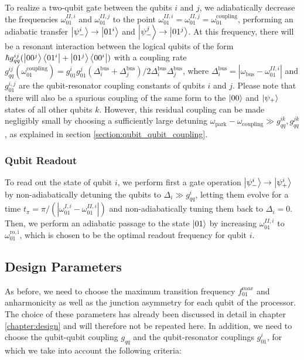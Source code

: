 To realize a two-qubit gate between the qubits $i$ and $j$, we adiabatically decrease the frequencies $\omega_{01}^{II,i}$ and $\omega_{01}^{II,j}$ to the point $\omega_{01}^{II,i}=\omega_{01}^{II,j}=\omega_{01}^{\mathrm{coupling}}$, performing an adiabatic transfer $\left| \psi_-^i \right>\to\left| 01^i \right>$ and $\left| \psi_-^j \right>\to\left| 01^j \right>$. At this frequency, there will be a resonant interaction between the logical qubits of the form $\hbar g_{qq}^{ij}(\left| 00^j \right>\left< 01^i \right|+\left| 01^j \right>\left< 00^i \right|)$ with a coupling rate $g_{qq}^{ij}(\omega_{01}^\mathrm{coupling})=g_{01}^i g_{01}^j (\Delta_i^\mathrm{bus}+\Delta_j^\mathrm{bus})/2\Delta_i^{\mathrm{bus}}\Delta_j^\mathrm{bus}$, where $\Delta_i^\mathrm{bus}=|\omega_\mathrm{bus}-\omega_{01}^{II,i}|$ and $g_{01}^{i,j}$ are the qubit-resonator coupling constants of qubits $i$ and $j$. Please note that there will also be a spurious coupling of the same form to the $\left| 00 \right>$ and $\left| \psi_+ \right>$ states of all other qubits $k$. However, this residual coupling can be made negligibly small by choosing a sufficiently large detuning $\omega_\mathrm{park}-\omega_\mathrm{coupling} \gg g_{qq}^{ik},g_{qq}^{jk}$, as explained in section \ref{section:qubit_qubit_coupling}.

\subsubsection{Qubit Readout}

To read out the state of qubit $i$, we perform first a gate operation $\left| \psi_-^i \right>\to\left| \psi_+^i \right>$ by non-adiabatically detuning the qubits to $\Delta_i\gg g_{qq}^i$, letting them evolve for a time $t_\pi=\pi/(|\omega_{01}^{I,i}-\omega_{01}^{II,i}|)$ and non-adiabatically tuning them back to $\Delta_i = 0$. Then, we perform an adiabatic passage to the state $\left| 01 \right>$ by increasing $\omega_{01}^{II,i}$ to $\omega_{01}^\mathrm{ro,i}$, which is chosen to be the optimal readout frequency for qubit $i$.

\subsection{Design Parameters}

As before, we need to choose the maximum transition frequency $f_{01}^{max}$ and anharmonicity as well as the junction asymmetry for each qubit of the processor. The choice of these parameters has already been discussed in detail in chapter \ref{chapter:design} and will therefore not be repeated here. In addition, we need to choose the qubit-qubit coupling $g_{qq}$ and the qubit-resonator couplings $g_{01}^i$, for which we take into account the following criteria:

